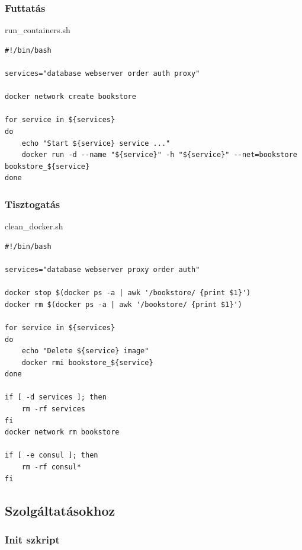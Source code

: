 \documentclass[11pt,magyar,a4paper,twoside,]{report}
\begin{document}
\subsubsection{Futtatás}\label{futtatuxe1s}

run\_containers.sh

\begin{verbatim}
#!/bin/bash

services="database webserver order auth proxy"

docker network create bookstore

for service in ${services}
do
    echo "Start ${service} service ..."
    docker run -d --name "${service}" -h "${service}" --net=bookstore bookstore_${service}
done
\end{verbatim}

\subsubsection{Tisztogatás}\label{tisztogatuxe1s}

clean\_docker.sh

\begin{verbatim}
#!/bin/bash

services="database webserver proxy order auth"

docker stop $(docker ps -a | awk '/bookstore/ {print $1}')
docker rm $(docker ps -a | awk '/bookstore/ {print $1}')

for service in ${services}
do
    echo "Delete ${service} image"
    docker rmi bookstore_${service}
done

if [ -d services ]; then
    rm -rf services
fi
docker network rm bookstore

if [ -e consul ]; then
    rm -rf consul*
fi
\end{verbatim}

\subsection{Szolgáltatásokhoz}\label{szolguxe1ltatuxe1sokhoz}

\subsubsection{Init szkript}\label{init-szkript}
\end{document}
